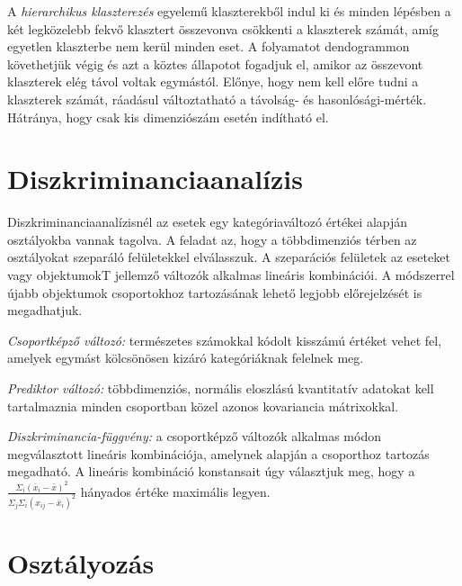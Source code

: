 A \emph{hierarchikus klaszterezés} egyelemű klaszterekből indul ki és minden lépésben a két legközelebb fekvő klasztert összevonva csökkenti a klaszterek számát, amíg egyetlen klaszterbe nem kerül minden eset. A folyamatot dendogrammon követhetjük végig és azt a köztes állapotot fogadjuk el, amikor az összevont klaszterek elég távol voltak egymástól. Előnye, hogy nem kell előre tudni a klaszterek számát, ráadásul változtatható a távolság- és hasonlósági-mérték. Hátránya, hogy csak kis dimenziószám esetén indítható el.

\section{Diszkriminanciaanalízis}

Diszkriminanciaanalízisnél az esetek egy kategóriaváltozó értékei alapján osztályokba vannak tagolva. A feladat az, hogy a többdimenziós térben az osztályokat szeparáló felületekkel elválasszuk. A szeparációs felületek az eseteket vagy objektumokT jellemző változók alkalmas lineáris kombinációi. A módszerrel újabb objektumok csoportokhoz tartozásának lehető legjobb előrejelzését is megadhatjuk.

\emph{Csoportképző változó:} természetes számokkal kódolt kisszámú értéket vehet fel, amelyek egymást kölcsönösen kizáró kategóriáknak felelnek meg.

\emph{Prediktor változó:} többdimenziós, normális eloszlású kvantitatív adatokat kell tartalmaznia minden csoportban közel azonos kovariancia mátrixokkal.

\emph{Diszkriminancia-függvény:} a csoportképző változók alkalmas módon megválasztott lineáris kombinációja, amelynek alapján a csoporthoz tartozás megadható. A lineáris kombináció konstansait úgy választjuk meg, hogy a $\frac{\Sigma_i (\bar{x}_i - \bar{x})^2}{\Sigma_j \Sigma_i (x_{ij} - \bar{x}_i)^2}$ hányados értéke maximális legyen.

\section{Osztályozás}

